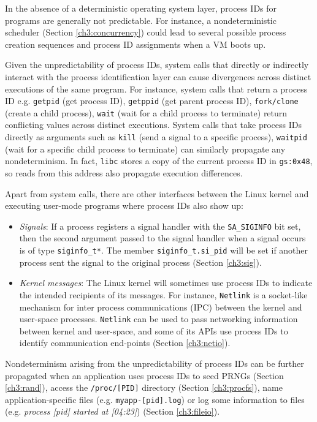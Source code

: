 In the absence of a deterministic operating system layer, process IDs for
programs are generally not predictable.
For instance, a nondeterministic scheduler (Section \ref{ch3:concurrency}) 
could lead to several possible process creation sequences
and process ID assignments when a VM boots up.
 
Given the unpredictability of process IDs,
system calls that directly or indirectly
interact with the process identification layer can cause divergences
across distinct executions of the same program.
For instance, system calls that return a process ID e.g.
\texttt{getpid} (get process ID), \texttt{getppid} (get
parent process ID), \texttt{fork/clone} (create a child process),
\texttt{wait} (wait for a child process to terminate)
return conflicting values across distinct executions. System calls that take process IDs 
directly as arguments such as \texttt{kill} (send a signal to a specific
process), \texttt{waitpid} (wait for a specific child process to terminate)
can similarly propagate any nondeterminism.
In fact, \texttt{libc} stores a copy of the current process ID in \texttt{gs:0x48},
so reads from this address also propagate execution differences.

Apart from system calls, there are other interfaces
between the Linux kernel and executing user-mode programs
where process IDs also show up:

\begin{itemize} 

\item {\em Signals}: If a process registers a signal handler with the \texttt{SA\_SIGINFO}
bit set, then the second argument passed
to the signal handler when a signal occurs is of type \texttt{siginfo\_t*}.
The member \texttt{siginfo\_t.si\_pid} will
be set if another process sent the signal 
to the original process (Section \ref{ch3:sig}). 

\item {\em Kernel messages}: The Linux kernel will sometimes use process IDs 
to indicate the intended recipients of its messages. 
For instance, \texttt{Netlink} is a socket-like
mechanism for inter process communications (IPC)
between the kernel and user-space processes.
\texttt{Netlink} can be used to pass
networking information between kernel
and user-space, and some of its APIs 
use process IDs to identify communication
end-points (Section \ref{ch3:netio}). \end{itemize}

Nondeterminism arising from the unpredictability of process IDs can be
further propagated when an application uses process IDs to seed PRNGs 
(Section \ref{ch3:rand}), access the \texttt{/proc/[PID]} directory
(Section \ref{ch3:procfs}), name application-specific files
(e.g. \texttt{myapp-[pid].log}) or log some information to files
(e.g. \emph{process [pid] started at [04:23]}) (Section \ref{ch3:fileio}). 

